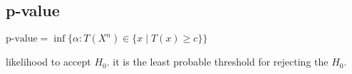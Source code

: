 \subsection*{p-value}
$\text{p-value} {=} \inf \{\alpha : T(X^n) {\in} \{ x {\mid} T(x) {\geq} c \} \}$

likelihood to accept $H_0$. it is the least probable threshold for rejecting the $H_0$.
